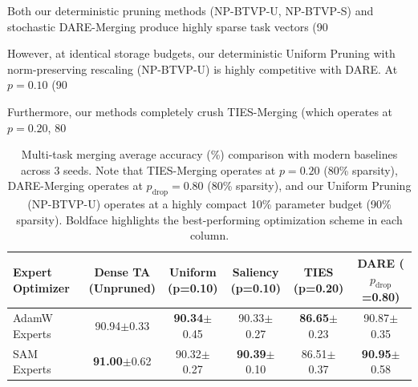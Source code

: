 Both our deterministic pruning methods (NP-BTVP-U, NP-BTVP-S) and stochastic DARE-Merging produce highly sparse task vectors (90%

However, at identical storage budgets, our deterministic Uniform Pruning with norm-preserving rescaling (NP-BTVP-U) is highly competitive with DARE. At $p=0.10$ (90%

Furthermore, our methods completely crush TIES-Merging (which operates at $p=0.20$, 80%

\begin{table}[t]
\caption{Multi-task merging average accuracy (\%) comparison with modern baselines across 3 seeds. Note that TIES-Merging operates at $p=0.20$ (80\% sparsity), DARE-Merging operates at $p_{\text{drop}}=0.80$ (80\% sparsity), and our Uniform Pruning (NP-BTVP-U) operates at a highly compact 10\% parameter budget (90\% sparsity). Boldface highlights the best-performing optimization scheme in each column.}
\label{tab:baselines_comparison}
\vskip 0.15in
\centering
\begin{tabular}{lccccc}
\toprule
\textbf{Expert Optimizer} & \shortstack{\textbf{Dense TA} \\ \small{(Unpruned)}} & \shortstack{\textbf{Uniform} \\ \small{(p=0.10)}} & \shortstack{\textbf{Saliency} \\ \small{(p=0.10)}} & \shortstack{\textbf{TIES} \\ \small{(p=0.20)}} & \shortstack{\textbf{DARE} \\ \small{($p_{\text{drop}}$=0.80)}} \\
\midrule
AdamW Experts & 90.94$\pm$0.33 & \textbf{90.34}$\pm$0.45 & 90.33$\pm$0.27 & \textbf{86.65}$\pm$0.23 & 90.87$\pm$0.35 \\
SAM Experts & \textbf{91.00}$\pm$0.62 & 90.32$\pm$0.27 & \textbf{90.39}$\pm$0.10 & 86.51$\pm$0.37 & \textbf{90.95}$\pm$0.58 \\
\bottomrule
\end{tabular}
\end{table}

